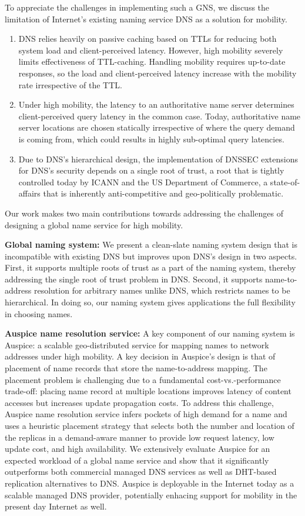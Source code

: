 To appreciate the challenges in implementing such a GNS, we discuss the limitation of Internet's existing naming service DNS as a solution for mobility.
\begin{enumerate}
	\item DNS relies heavily on passive caching based on TTLs for reducing both system load and client-perceived latency. However, high mobility severely limits effectiveness of TTL-caching. Handling mobility requires up-to-date responses, so the load and client-perceived latency increase with the mobility rate irrespective of the TTL.
	\item Under high mobility, the latency to an authoritative name server determines client-perceived query latency in the common case. Today, authoritative name server locations are chosen statically irrespective of where the query demand is coming from, which could results in highly sub-optimal query latencies. 
	\item Due to DNS's hierarchical design, the implementation of DNSSEC extensions for DNS's security depends on a single root of trust, a root that is tightly controlled today by ICANN and the US Department of Commerce, a state-of-affairs that is inherently anti-competitive and geo-politically problematic. 
\end{enumerate}

Our work makes two main contributions towards addressing the challenges of designing a global name service for high mobility. 

\textbf{Global naming system:} We present a clean-slate naming system design that is incompatible with existing DNS but improves upon DNS's design in two aspects. First, it supports multiple roots of trust as a part of the naming system, thereby addressing the single root of trust problem in DNS. Second, it supports name-to-address resolution for arbitrary names unlike DNS, which restricts names to be hierarchical. In doing so, our naming system gives applications the full flexibility in choosing names. 

\textbf{Auspice name resolution service:} A key component of our naming system is Auspice: a scalable geo-distributed service for mapping names to network addresses under high mobility. A key decision in Auspice's design is that of placement of name records that store the name-to-address mapping. The placement problem is challenging due to a fundamental cost-vs.-performance trade-off: placing name record at multiple locations improves latency of content accesses but increases update propagation costs. To address this challenge, Auspice name resolution service infers pockets of high demand for a name and uses a heuristic placement strategy that selects both the number and location of the replicas in a demand-aware manner to provide low request latency, low update cost, and high availability.  We extensively evaluate Auspice for an expected workload of a global name service and show that it significantly outperforms both commercial managed DNS services as well as DHT-based replication alternatives to DNS. Auspice is deployable in the Internet today as a scalable managed DNS provider, potentially enhacing support for mobility in the present day Internet as well.

